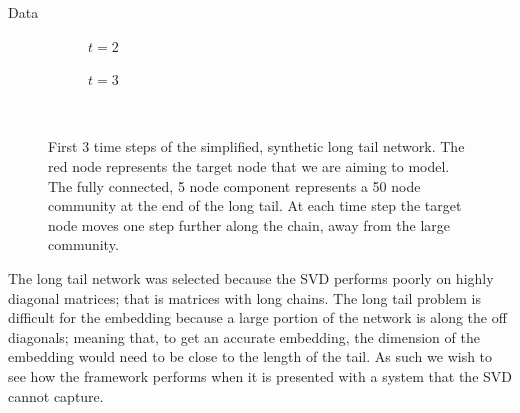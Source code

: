 \documentclass[12pt]{amsbook}
\begin{document}
\begin{chapter}{Data}
\begin{figure}[H]
\begin{subfigure}[c]{0.3\textwidth}
                \centering
                \resizebox{.6\width}{!}{}
                \caption{$t=2$}
                \label{longTail train series b}
            \end{subfigure}
            \hfill
            \centering
            \begin{subfigure}[c]{0.3\textwidth}
                \centering
                \resizebox{.6\width}{!}{}
                \caption{$t=3$}
                \label{longTail train series c}
            \end{subfigure}\\
            \caption{First 3 time steps of the simplified, synthetic long tail network. The red node represents the target node that we are aiming to model. The fully connected, 5 node component represents a 50 node community at the end of the long tail. At each time step the target node moves one step further along the chain, away from the large community.}
            \label{longTail train series}
        \end{figure}    

        The long tail network was selected because the SVD performs poorly on highly diagonal matrices; that is matrices with long chains.  The long tail problem is difficult for the embedding because a large portion of the network is along the off diagonals; meaning that, to get an accurate embedding, the dimension of the embedding would need to be close to the length of the tail. As such we wish to see how the framework performs when it is presented with a system that the SVD cannot capture.


\end{chapter}
\end{document}
